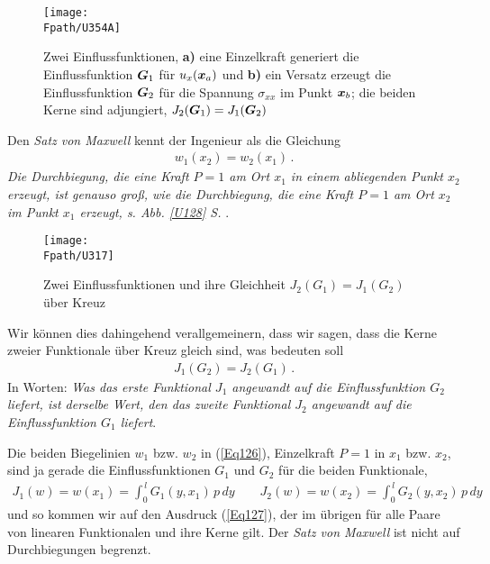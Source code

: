 \begin{figure}
\centering
\if {} \sidecaption \fi
\texttt{[image: \\Fpath/U354A]}
\caption{Zwei Einflussfunktionen, \textbf{ a)} eine Einzelkraft generiert die Einflussfunktion $\mbox{\boldmath $G$}_1$ f\"{u}r $u_x(\mbox{\boldmath $x$}_a)$ und \textbf{ b)} ein Versatz erzeugt die Einflussfunktion $\mbox{\boldmath $G$}_2$ f\"{u}r die Spannung $\sigma_{xx}$ im Punkt $\mbox{\boldmath $x$}_b$; die beiden Kerne sind adjungiert, $J_2(\mbox{\boldmath $G$}_1) = J_1(\mbox{\boldmath $G$}_2)$}
\label{UE354}%
\end{figure}%
Den {\em Satz von Maxwell\/} kennt der Ingenieur als die Gleichung
\begin{align} \label{Eq126}
w_1(x_2) = w_2(x_1)\,.
\end{align}
{\em Die Durchbiegung, die eine Kraft $P = 1$ am Ort $x_1$ in einem abliegenden Punkt $x_2$ erzeugt, ist genauso gro{\ss}, wie die Durchbiegung, die eine Kraft $P = 1$ am Ort $x_2$ im Punkt $x_1$ erzeugt, s. Abb. \ref{U128} S. \pageref{U128}\/}.
\begin{figure}
\centering
\if {} \sidecaption \fi
\texttt{[image: \\Fpath/U317]}
\caption{Zwei Einflussfunktionen und ihre Gleichheit $J_2(G_1) = J_1(G_2)$ \"{u}ber Kreuz}
\label{U317}%
\end{figure}%

Wir k\"{o}nnen dies dahingehend verallgemeinern, dass wir sagen, dass die Kerne zweier Funktionale \glq \"{u}ber Kreuz\grq{} gleich sind, was bedeuten soll
\begin{align}\label{Eq127}
\boxed{J_1(G_2) = J_2(G_1)}\,.
\end{align}
In Worten: {\em Was das erste Funktional $J_1$ angewandt auf die Einflussfunktion $G_2$ liefert, ist derselbe Wert, den das zweite Funktional $J_2$ angewandt auf die Einflussfunktion $G_1$ liefert\/}.

Die beiden Biegelinien $w_1$ bzw. $w_2$ in (\ref{Eq126}), Einzelkraft $P = 1$ in $x_1$ bzw. $x_2$, sind ja gerade die Einflussfunktionen $G_1$ und $G_2$ f\"{u}r die beiden Funktionale,
\begin{align}
J_1(w) = w(x_1) = \int_0^{\,l} G_1(y,x_1)\,p\,dy \qquad J_2(w) = w(x_2)= \int_0^{\,l} G_2(y,x_2)\,p\,dy
\end{align}
und so kommen wir auf den Ausdruck (\ref{Eq127}), der im \"{u}brigen f\"{u}r alle Paare von linearen Funktionalen und ihre Kerne gilt. Der {\em Satz von Maxwell\/} ist nicht auf Durchbiegungen begrenzt.

